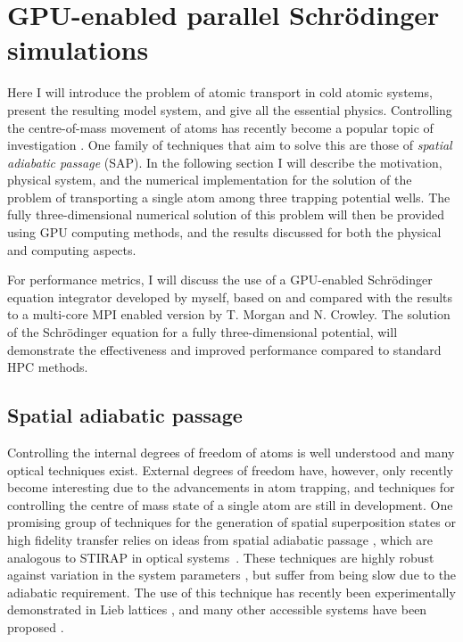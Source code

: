 \section{GPU-enabled parallel Schr\"odinger simulations}
\label{sec:3D_Stirap_parallel_Schrodinger_simulations}

Here I will introduce the problem of atomic transport in cold atomic systems, present the resulting model system, and give all the essential physics. Controlling the centre-of-mass movement of atoms has recently become a popular topic of investigation \cite{AO:SAP_REVIEW_2016}. One family of techniques that aim to solve this are those of \textit{spatial adiabatic passage} (SAP). In the following section I will describe the motivation, physical system, and the numerical implementation for the solution of the problem of transporting a single atom among three trapping potential wells. The fully three-dimensional numerical solution of this problem will then be provided using GPU computing methods, and the results discussed for both the physical and computing aspects.

For performance metrics, I will discuss the use of a GPU-enabled Schr\"odinger equation integrator developed by myself, based on and compared with the results to a multi-core MPI enabled version by T. Morgan and N. Crowley. The solution of the Schr\"odinger equation for a fully three-dimensional potential, will demonstrate the effectiveness and improved performance compared to standard HPC methods.

\subsection{Spatial adiabatic passage}
Controlling the internal degrees of freedom of atoms is well understood and many optical techniques exist. External degrees of freedom have, however, only recently become interesting due to the advancements in atom trapping, and techniques for controlling the centre of mass state of a single atom are still in development. One promising group of techniques for the generation of spatial superposition states or high fidelity transfer relies on ideas from spatial adiabatic passage \cite{AO:SAP_REVIEW_2016}, which are analogous to STIRAP in optical systems~\cite{AO:Bergmann_jcp_2015}. These techniques are highly robust against variation in the system parameters \cite{Eckert:04}, but suffer from being slow due to the adiabatic requirement. The use of this technique has recently been experimentally demonstrated in Lieb lattices \cite{AO:Taie_oist_2016}, and many other accessible systems have been proposed \cite{Eckert:06,Morgan:11,Kohler:13}.


